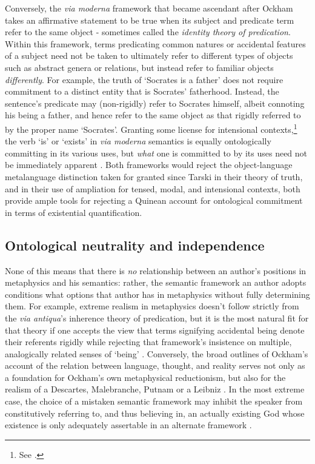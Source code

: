 \documentclass[]{article}
\begin{document}
Conversely, the \emph{via moderna} framework that became ascendant after Ockham 
takes an affirmative statement to be true when its subject and predicate term refer to the same object 
 - sometimes called the \emph{identity theory of predication}. 
Within this framework, 
terms predicating common natures or accidental features of a subject need not be taken to ultimately refer to different types of objects such as abstract genera or relations, 
but instead refer to familiar objects \emph{differently}. 
For example, the truth of `Socrates is a father' does not require commitment to a distinct entity that is Socrates' fatherhood.
Instead, the sentence's predicate may (non-rigidly) refer to Socrates himself, albeit connoting his being a father, 
and hence refer to the same object as that rigidly referred to by the proper name `Socrates'. 
Granting some license for intensional contexts,\footnote{See \autocite{Klima2005}.} 
the verb `is' or `exists' in \emph{via moderna} semantics is equally ontologically committing in its various uses, 
but \emph{what} one is committed to by its uses need not be immediately apparent  \autocite[437-430]{Klima2008a}. 
Both frameworks would reject the object-language metalanguage distinction taken for granted since Tarski in their theory of truth,
and 
in their use of ampliation for tensed, modal, and intensional contexts,
both provide ample tools for rejecting a Quinean account for ontological commitment in terms of existential quantification.

\subsection{Ontological neutrality and independence}
None of this means that there is \emph{no} relationship between an author's positions in metaphysics and his semantics: 
rather, the semantic framework an author adopts conditions what options that author has in metaphysics without fully determining them. 
For example, extreme realism in metaphysics doesn't follow strictly from the \emph{via antiqua}'s inherence theory of predication, 
but it is the most natural fit for that theory 
if one accepts the view that terms signifying accidental being denote their referents rigidly 
while rejecting that framework's insistence on multiple, analogically related senses of `being' \autocite{Klima1999}. 
Conversely, the broad outlines of Ockham's account of the relation between language, thought, and reality 
serves not only as a foundation for Ockham's own metaphysical reductionism, 
but also for the realism of a Descartes, Malebranche, Putnam or a Leibniz \autocite{Klima1991}. 
In the most extreme case, the choice of a mistaken semantic framework may inhibit the speaker from constitutively referring to, 
and thus believing in, 
an actually existing God whose existence is only adequately assertable in an alternate framework \autocite[74]{Klima2008b}. %
\end{document}
